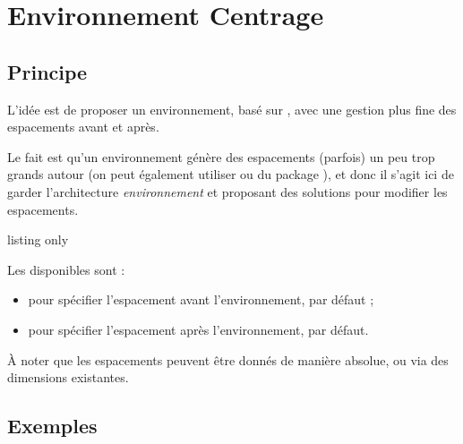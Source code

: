 \documentclass[french,11pt,a4paper]{article}
\begin{document}
\pagebreak

\section{Environnement Centrage}

\subsection{Principe}

L'idée est de proposer un environnement, basé sur , avec une gestion plus fine des espacements avant et après.

Le fait est qu'un environnement  génère des espacements (parfois) un peu trop grands autour (on peut également utiliser  ou  du package ), et donc il s'agit ici de garder l'architecture \textit{environnement} et proposant des solutions pour modifier les espacements.

\begin{DemoCode}{listing only}
\begin{Centrage}[options]
\end{Centrage}
\end{DemoCode}

Les  disponibles sont :

\begin{itemize}
	\item {} pour spécifier l'espacement avant l'environnement,  par défaut ;
	\item {} pour spécifier l'espacement après l'environnement,  par défaut.
\end{itemize}

À noter que les espacements peuvent être donnés de manière absolue, ou via des dimensions existantes.

\subsection{Exemples}

\begin{DemoCode}{}
\lipsum[1][1-3]

\begin{center}
    \lipsum[1][1]
\end{center}

\lipsum[1][1-2]
\end{DemoCode}
\end{document}
